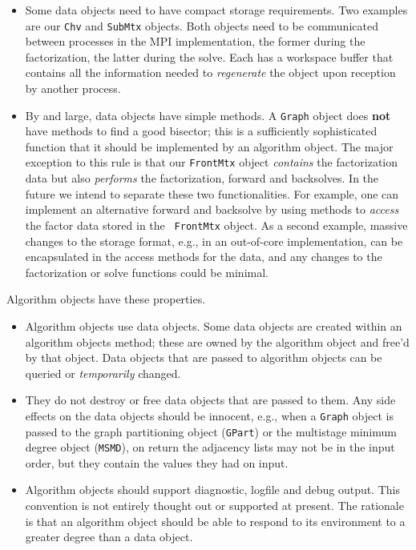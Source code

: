 \begin{itemize}
\item
Some data objects need to have compact storage requirements.
Two examples are our {\tt Chv} and {\tt SubMtx} objects.
Both objects need to be communicated between processes
in the MPI implementation, the former during the factorization,
the latter during the solve.
Each has a workspace buffer that contains all the information
needed to {\it regenerate} the object upon reception by another
process.
\item
By and large, data objects have simple methods.
A {\tt Graph} object does {\bf not} have methods to find a good
bisector; this is a sufficiently sophisticated function that it
should be implemented by an algorithm object.
The major exception to this rule is that our {\tt FrontMtx} object
{\it contains} the factorization data but also {\it performs} the
factorization, forward and backsolves.
In the future we intend to separate these two functionalities.
For example, one can implement an alternative forward and backsolve
by using methods to {\it access} the factor data stored in the {\tt
FrontMtx} object.
As a second example, massive changes to the storage format,
e.g., in an out-of-core implementation, can be encapsulated in the
access methods for the data, and any changes to the factorization
or solve functions could be minimal.
\end{itemize}
Algorithm objects have these properties.
\begin{itemize}
\item
Algorithm objects use data objects.
Some data objects are created within an algorithm objects method; 
these are owned by the algorithm object and free'd by that object.
Data objects that are passed to algorithm objects can be queried
or {\it temporarily} changed.
\item
They do not destroy or free data objects that are passed to them.
Any side effects on the data objects should be innocent, e.g.,
when a {\tt Graph} object is passed to the graph partitioning
object ({\tt GPart}) or the multistage minimum degree object
({\tt MSMD}), on return the adjacency lists may not be in the input
order, but they contain the values they had on input.
\item
Algorithm objects should support diagnostic, logfile and debug output.
This convention is not entirely thought out or supported at present. 
The rationale is that an algorithm object should be able to respond
to its environment to a greater degree than a data object.
\end{itemize}
\par
